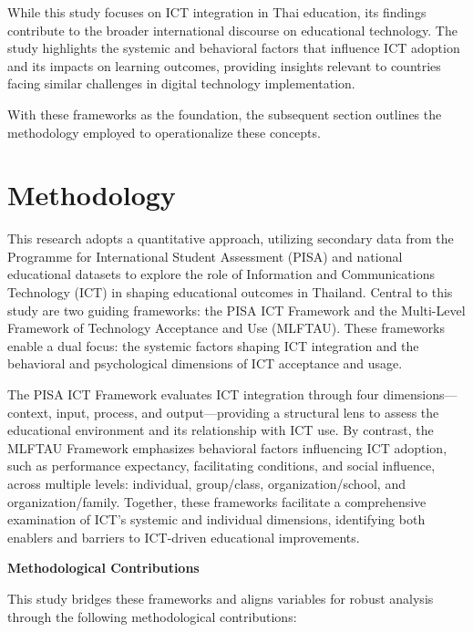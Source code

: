 \documentclass[
]{article}
\begin{document}
While this study focuses on ICT integration in Thai education, its
findings contribute to the broader international discourse on
educational technology. The study highlights the systemic and behavioral
factors that influence ICT adoption and its impacts on learning
outcomes, providing insights relevant to countries facing similar
challenges in digital technology implementation.

With these frameworks as the foundation, the subsequent section outlines
the methodology employed to operationalize these concepts.

\hypertarget{methodology}{%
\section{Methodology}\label{methodology}}

This research adopts a quantitative approach, utilizing secondary data
from the Programme for International Student Assessment (PISA) and
national educational datasets to explore the role of Information and
Communications Technology (ICT) in shaping educational outcomes in
Thailand. Central to this study are two guiding frameworks: the PISA ICT
Framework and the Multi-Level Framework of Technology Acceptance and Use
(MLFTAU). These frameworks enable a dual focus: the systemic factors
shaping ICT integration and the behavioral and psychological dimensions
of ICT acceptance and usage.

The PISA ICT Framework evaluates ICT integration through four
dimensions---context, input, process, and output---providing a
structural lens to assess the educational environment and its
relationship with ICT use. By contrast, the MLFTAU Framework emphasizes
behavioral factors influencing ICT adoption, such as performance
expectancy, facilitating conditions, and social influence, across
multiple levels: individual, group/class, organization/school, and
organization/family. Together, these frameworks facilitate a
comprehensive examination of ICT's systemic and individual dimensions,
identifying both enablers and barriers to ICT-driven educational
improvements.

\textbf{Methodological Contributions}

This study bridges these frameworks and aligns variables for robust
analysis through the following methodological contributions:
\end{document}
